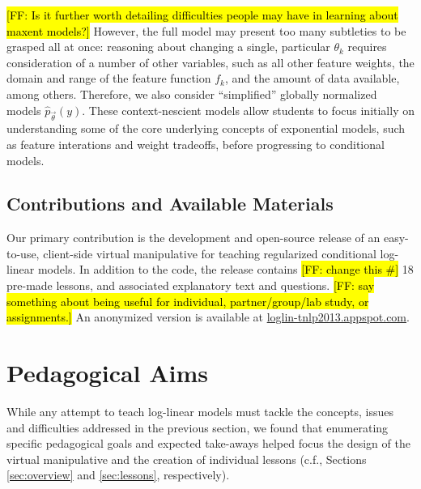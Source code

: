 \documentclass[11pt,letterpaper]{article}
\newcommand{\Note}[1]{}
\renewcommand{\Note}[1]{\hl{[#1]}}
\newcommand{\NoteSigned}[3]{{\sethlcolor{#2}\Note{#1: #3}}}
\newcommand{\NoteFF}[1]{\NoteSigned{FF}{LightBlue}{#1}}
\newcommand{\WhereToFind}[0]{\url{loglin-tnlp2013.appspot.com}}
\begin{document}
\NoteFF{Is it further worth detailing difficulties people may have in learning about maxent models?}
However, the full model may present too many subtleties to be grasped all at once: reasoning about changing a single, particular $\theta_k$ requires consideration of a number of other variables, such as all other feature weights, the domain and range of the feature function $f_k$, and the amount of data available, among others. Therefore, we also consider ``simplified'' globally normalized models $\hat{p}_{\vec{\theta}}\left(y\right)$. These context-nescient models allow students to focus initially on understanding some of the core underlying concepts of exponential models, such as feature interations and weight tradeoffs, before progressing to conditional models.

\subsection{Contributions and Available Materials}
Our primary contribution is the development and open-source release of an easy-to-use, client-side virtual manipulative for teaching regularized conditional log-linear models. In addition to the code, the release contains \NoteFF{change this \#} 18 pre-made lessons, and associated explanatory text and questions. \NoteFF{say something about being useful for individual, partner/group/lab study, or assignments.} An anonymized version is available at \WhereToFind{}.


\section{Pedagogical Aims}\label{sec:aims}
While any attempt to teach log-linear models must tackle the concepts, issues and difficulties addressed in the previous section, we found that enumerating specific pedagogical goals and expected take-aways helped focus the design of the virtual manipulative and the creation of individual lessons (c.f., Sections \ref{sec:overview} and \ref{sec:lessons}, respectively).
\end{document}
